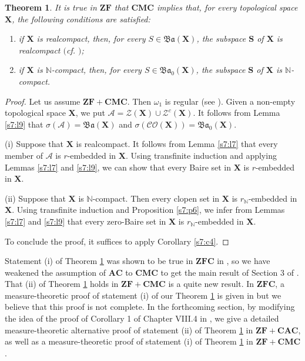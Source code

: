 \documentclass[12pt,twoside,leqno]{article}
\theoremstyle{plain}
\newtheorem{theorem}{Theorem}[section]
\theoremstyle{definition}
\theoremstyle{remark}
\begin{document}
\begin{theorem}
	\label{s7:t10}
	It is true in $\mathbf{ZF}$ that $\mathbf{CMC}$ implies that, for every topological space $\mathbf{X}$, the following conditions are satisfied:
	\begin{enumerate}
		\item[(i)] if $\mathbf{X}$ is realcompact, then, for every $S\in\mathfrak{Ba}(\mathbf{X})$, the subspace $\mathbf{S}$ of $\mathbf{X}$ is realcompact $($cf. \cite[Theorem 3.8]{neg}$)$;
		\item[(ii)] if $\mathbf{X}$ is $\mathbb{N}$-compact, then, for every $S\in\mathfrak{Ba}_0(\mathbf{X})$, the subspace $\mathbf{S}$ of $\mathbf{X}$ is $\mathbb{N}$-compact.
	\end{enumerate}
\end{theorem}
\begin{proof}
	Let us assume $\mathbf{ZF+CMC}$.  Then $\omega_1$ is regular (see \cite{hr1}). Given a non-empty topological space $\mathbf{X}$, we put $\mathcal{A}=\mathcal{Z}(\mathbf{X})\cup\mathcal{Z}^{c}(\mathbf{X})$. It follows from Lemma \ref{s7:l9} that $\sigma(\mathcal{A})=\mathfrak{Ba}(\mathbf{X})$ and $\sigma(\mathcal{CO}(\mathbf{X}))=\mathfrak{Ba}_0(\mathbf{X})$.
	
	(i) Suppose that $\mathbf{X}$ is realcompact. It follows from Lemma \ref{s7:l7} that every member of $\mathcal{A}$ is $r$-embedded in $\mathbf{X}$.  Using transfinite induction and applying Lemmas \ref{s7:l7} and \ref{s7:l9}, we can show that every Baire set in $\mathbf{X}$ is $r$-embedded in $\mathbf{X}$.
	
	(ii) Suppose that $\mathbf{X}$ is $\mathbb{N}$-compact. Then every clopen set in $\mathbf{X}$ is $r_{\mathbb{N}}$-embedded in $\mathbf{X}$.  Using transfinite induction and Proposition \ref{s7:p6}, we infer from Lemmas \ref{s7:l7} and \ref{s7:l9} that every zero-Baire set in $\mathbf{X}$ is $r_{\mathbb{N}}$-embedded in $\mathbf{X}$.
	
	To conclude the proof, it suffices to apply Corollary \ref{s7:c4}.
\end{proof}

Statement (i) of Theorem \ref{s7:t10} was shown to be true in $\mathbf{ZFC}$ in \cite[Theorem 3.8]{neg}, so we have weakened the assumption of $\mathbf{AC}$ to $\mathbf{CMC}$ to get the main result of Section 3 of \cite{neg}.  That (ii) of Theorem \ref{s7:t10} holds in $\mathbf{ZF+CMC}$ is a quite new result. In $\mathbf{ZFC}$, a measure-theoretic proof of statement (i) of our Theorem \ref{s7:t10} is given in \cite[pp. 487--488, Chapter VIII.4, the proof of Corollary 1]{nag} but we believe that this proof is not complete. In the forthcoming section, by modifying the idea of the proof of Corollary 1 of Chapter VIII.4 in \cite{nag}, we give a detailed measure-theoretic alternative proof of statement (ii) of Theorem \ref{s7:t10} in $\mathbf{ZF+CAC}$, as well as a measure-theoretic proof of statement (i) of Theorem \ref{s7:t10} in $\mathbf{ZF+CMC}$. 
\end{document}
